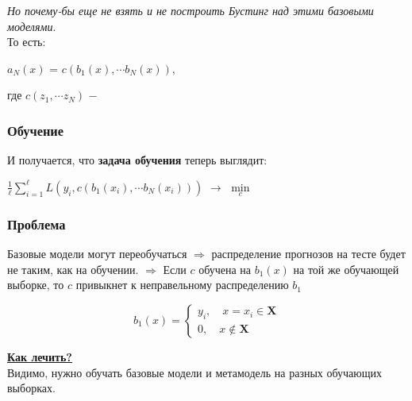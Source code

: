         \textit{Но почему-бы еще не взять и не построить Бустинг над этими базовыми моделями}.\\

        То есть:
        \begin{center}
        \Large
            $a_N(x)$ = $c(b_1(x), \cdots b_N(x))$,
        \end{center}
        где $c(z_1, \cdots z_N)$ $-$ \\

        \subsubsection{Обучение}
        
        И получается, что \textbf{задача обучения} теперь выглядит:
        \begin{center}
        \Large
            $\frac{1}{\ell}\sum\limits_{i = 1}^\ell L(y_i, c(b_1(x_i), \cdots b_N(x_i)))$ $\longrightarrow$ $\min\limits_c$
        \end{center}

        \subsubsection{Проблема}

            Базовые модели могут переобучаться $\Longrightarrow$ распределение прогнозов на тесте будет не таким, как на обучении. $\Longrightarrow$ Если $c$ обучена на $b_1(x)$ на той же обучающей выборке, то $c$ привыкнет к неправельному распределению $b_1$

            \begin{equation}
                b_1(x) = 
                \begin{cases}
                    y_i, \quad x = x_i \in \mathbf{X} \\
                    0, \quad x \notin \mathbf{X}
                \end{cases}
            \end{equation}

            \textbf{\underline{Как лечить?}}\\

            Видимо, нужно обучать базовые модели и метамодель на разных обучающих выборках.\\


